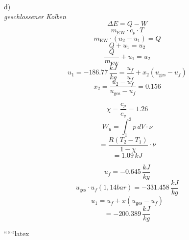 d) \\
\textit{geschlossener Kolben} \\
\[
\Delta E = Q - W
\]
\[
m_{\text{EW}} \cdot c_p \cdot T
\]
\[
m_{\text{EW}} \cdot (u_2 - u_1) = Q
\]
\[
Q + u_1 = u_2
\]
\[
\frac{Q}{m_{\text{EW}}} + u_1 = u_2
\]
\[
u_1 = -186.77 \, \frac{kJ}{kg} = \frac{u_f}{u_f} + x_2 (u_{\text{ges}} - u_f)
\]
\[
x_2 = \frac{u_2 - u_f}{u_{\text{ges}} - u_f} = 0.156
\]

\[
\chi = \frac{c_p}{c_v} = 1.26
\]
\[
W_u = \int_1^2 p \, dV \cdot \nu
\]
\[
= \frac{R (T_2 - T_1)}{1 - \chi} \cdot \nu
\]
\[
= 1.09 \, kJ
\]

\[
u_f = -0.645 \, \frac{kJ}{kg}
\]
\[
u_{\text{ges}} \cdot u_f (1,14 bar) = -331.458 \, \frac{kJ}{kg}
\]
\[
u_1 = u_f + x (u_{\text{ges}} - u_f)
\]
\[
= -200.389 \, \frac{kJ}{kg}
\]

``````latex